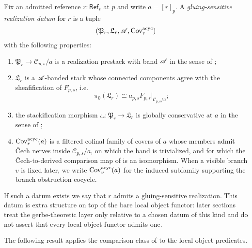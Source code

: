 \begin{definition}\label{def:gluing-sensitive-realization}
Fix an admitted reference $r:\mathsf{Ref}_s$ at $p$ and write $a=[r]_p$. A \emph{gluing-sensitive realization datum} for $r$ is a tuple
\[
(\mathfrak P_r,\mathfrak L_r,\mathscr{A},\mathrm{Cov}_r^{\mathrm{acyc}})
\]
with the following properties:
\begin{enumerate}[label=(\roman*),nosep]
\item $\mathfrak P_r\to\mathcal C_{p,s}/a$ is a realization prestack with band $\mathscr{A}$ in the sense of ;
\item $\mathfrak L_r$ is a $\mathscr{A}$-banded stack whose connected components agree with the sheafification of $F_{p,s}$, i.e.
\[
\pi_0(\mathfrak L_r)\cong a_{p,s}F_{p,s}|_{\mathcal C_{p,s}/a};
\]
\item the stackification morphism $\iota_r:\mathfrak P_r\to\mathfrak L_r$ is globally conservative at $a$ in the sense of ;
\item $\mathrm{Cov}_r^{\mathrm{acyc}}(a)$ is a filtered cofinal family of covers of $a$ whose members admit \v{C}ech nerves inside $\mathcal C_{p,s}/a$, on which the band is trivialized, and for which the \v{C}ech-to-derived comparison map of  is an isomorphism. When a visible branch $v$ is fixed later, we write $\mathrm{Cov}_v^{\mathrm{acyc}}(a)$ for the induced subfamily supporting the branch obstruction cocycle.
\end{enumerate}
If such a datum exists we say that $r$ admits a gluing-sensitive realization. This datum is extra structure on top of the bare local object functor: later sections treat the gerbe-theoretic layer only relative to a chosen datum of this kind and do not assert that every local object functor admits one.
\end{definition}

The following result applies the comparison class of  to the local-object predicates.

